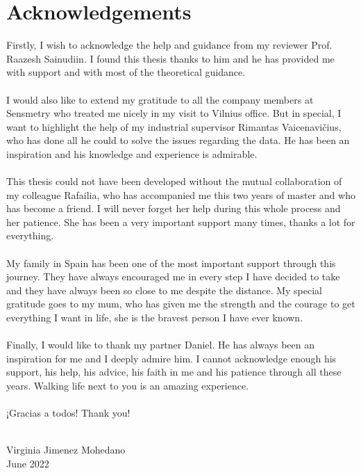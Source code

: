 \chapter*{Acknowledgements}

Firstly, I wish to acknowledge the help and guidance from my reviewer Prof. Raazesh Sainudiin. I found this thesis thanks to him and he has provided me with support and with most of the theoretical guidance.
\\
\\
I would also like to extend my gratitude to all the company members at Sensmetry who treated me nicely in my visit to Vilnius office. But in special, I want to highlight the help of my industrial supervisor Rimantas Vaicenavičius, who has done all he could to solve the issues regarding the data. He has been an inspiration and his knowledge and experience is admirable. 
\\
\\
This thesis could not have been developed without the mutual collaboration of my colleague Rafailia, who has accompanied me this two years of master and who has become a friend. I will never forget her help during this whole process and her patience. She has been a very important support many times, thanks a lot for everything. 
\\
\\
My family in Spain has been one of the most important support through this journey. They have always encouraged me in every step I have decided to take and they have always been so close to me despite the distance. My special gratitude goes to my mum, who has given me the strength and the courage to get everything I want in life, she is the bravest person I have ever known.
\\
\\
Finally, I would like to thank my partner Daniel. He has always been an inspiration for me and I deeply admire him. I cannot acknowledge enough his support, his help, his advice, his faith in me and his patience through all these years. Walking life next to you is an amazing experience. 
\\
\\
¡Gracias a todos! Thank you!
\\
\\
\begin{flushright}

Virginia Jimenez Mohedano
\\
June 2022
\end{flushright}